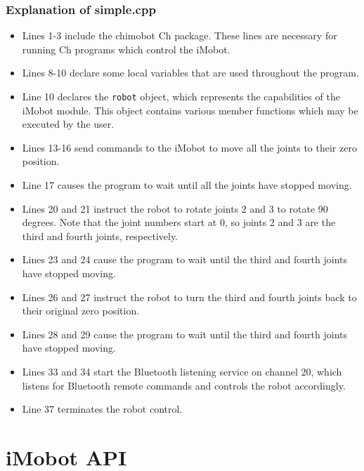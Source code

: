 \documentclass[11pt]{report}
\begin{document}
\subsection{Explanation of simple.cpp}
\begin{itemize}
\item Lines 1-3 include the chimobot Ch package. These lines are necessary for
running Ch programs which control the iMobot. 
\item Lines 8-10 declare some local variables that are used throughout the program.
\item Line 10 declares the \texttt{robot} object, which represents the
capabilities of the iMobot module. This object contains various member
functions which may be executed by the user.
\item Lines 13-16 send commands to the iMobot to move all the joints to their
zero position.
\item Line 17 causes the program to wait until all the joints have stopped moving. 
\item Lines 20 and 21 instruct the robot to rotate joints 2 and 3 to rotate 90
degrees. Note that the joint numbers start at 0, so joints 2 and 3 are the
third and fourth joints, respectively. 
\item Lines 23 and 24 cause the program to wait until the third and fourth
joints have stopped moving.
\item Lines 26 and 27 instruct the robot to turn the third and fourth joints
back to their original zero position.
\item Lines 28 and 29 cause the program to wait until the third and fourth
joints have stopped moving.
\item Lines 33 and 34 start the Bluetooth listening service on channel 20,
which listens for Bluetooth remote commands and controls the robot accordingly. 
\item Line 37 terminates the robot control.
\end{itemize}

\appendix
\chapter{iMobot API}

\pagebreak

{}
\printindex
\end{document}
